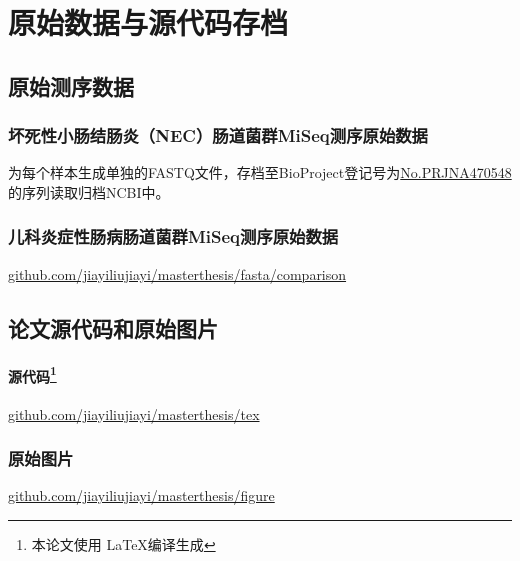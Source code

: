 \chapter{原始数据与源代码存档}
\label{app:archive}

\section{原始测序数据}
  \subsection{坏死性小肠结肠炎（NEC）肠道菌群MiSeq测序原始数据}
  为每个样本生成单独的FASTQ文件，存档至BioProject登记号为\href{https://www.ncbi.nlm.nih.gov/bioproject/PRJNA470548}{No.PRJNA470548}的序列读取归档NCBI中。
  \subsection{儿科炎症性肠病肠道菌群MiSeq测序原始数据}
  \href{github.com/jiayiliujiayi/masterthesis/fasta/comparison}{github.com/jiayiliujiayi/masterthesis/fasta/comparison}

\section{论文源代码和原始图片}
  \subsubsection{源代码\protect\footnote{本论文使用 \LaTeX 编译生成}}
  \href{github.com/jiayiliujiayi/masterthesis/tex}{github.com/jiayiliujiayi/masterthesis/tex}
  \subsection{原始图片}
  \href{github.com/jiayiliujiayi/masterthesis/figure}{github.com/jiayiliujiayi/masterthesis/figure}
